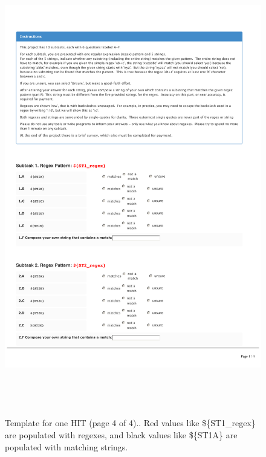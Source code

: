\begin{figure}[!htbp]
       \includegraphics[page=4, height=20cm, keepaspectratio]{nontex/MTtemplate}
 \caption{Template for one HIT (page 4 of 4)..  Red values like  \$\{ST1\_regex\} are populated with regexes, and black values like \$\{ST1A\} are populated with matching strings.}
 \label{fig:MTtemplate4}
\end{figure}
